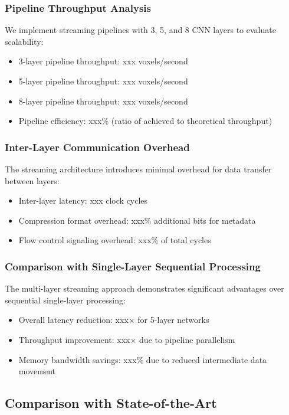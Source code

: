 \documentclass[sigconf, screen]{acmart}
\begin{document}
\subsubsection{Pipeline Throughput Analysis}
We implement streaming pipelines with 3, 5, and 8 CNN layers to evaluate scalability:
\begin{itemize}
  \item 3-layer pipeline throughput: xxx voxels/second
  \item 5-layer pipeline throughput: xxx voxels/second
  \item 8-layer pipeline throughput: xxx voxels/second
  \item Pipeline efficiency: xxx\% (ratio of achieved to theoretical throughput)
\end{itemize}

\subsubsection{Inter-Layer Communication Overhead}
The streaming architecture introduces minimal overhead for data transfer between layers:
\begin{itemize}
  \item Inter-layer latency: xxx clock cycles
  \item Compression format overhead: xxx\% additional bits for metadata
  \item Flow control signaling overhead: xxx\% of total cycles
\end{itemize}

\subsubsection{Comparison with Single-Layer Sequential Processing}
The multi-layer streaming approach demonstrates significant advantages over sequential single-layer processing:
\begin{itemize}
  \item Overall latency reduction: xxx× for 5-layer networks
  \item Throughput improvement: xxx× due to pipeline parallelism
  \item Memory bandwidth savings: xxx\% due to reduced intermediate data movement
\end{itemize}

\subsection{Comparison with State-of-the-Art}
\end{document}
